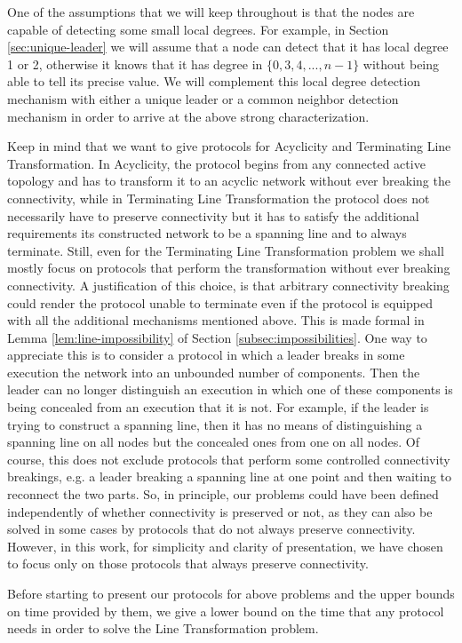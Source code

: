 \documentclass[preprint]{elsarticle}
\begin{document}
One of the assumptions that we will keep throughout is that the nodes are capable of detecting some small local degrees. For example, in Section \ref{sec:unique-leader} we will assume that a node can detect that it has local degree 1 or 2, otherwise it knows that it has degree in $\{0,3,4,...,n-1\}$ without being able to tell its precise value. We will complement this local degree detection mechanism with either a unique leader or a common neighbor detection mechanism in order to arrive at the above strong characterization. 

Keep in mind that we want to give protocols for Acyclicity and Terminating Line Transformation. In Acyclicity, the protocol begins from any connected active topology and has to transform it to an acyclic network without ever breaking the connectivity, while in Terminating Line Transformation the protocol does not necessarily have to preserve connectivity but it has to satisfy the additional requirements its constructed network to be a spanning line and to always terminate. Still, even for the Terminating Line Transformation problem we shall mostly focus on protocols that perform the transformation without ever breaking connectivity. A justification of this choice, is that arbitrary connectivity breaking could render the protocol unable to terminate even if the protocol is equipped with all the additional mechanisms mentioned above. This is made formal in Lemma \ref{lem:line-impossibility} of Section \ref{subsec:impossibilities}. One way to appreciate this is to consider a protocol in which a leader breaks in some execution the network into an unbounded number of components. Then the leader can no longer distinguish an execution in which one of these components is being concealed from an execution that it is not. For example, if the leader is trying to construct a spanning line, then it has no means of distinguishing a spanning line on all nodes but the concealed ones from one on all nodes. Of course, this does not exclude protocols that perform some controlled connectivity breakings, e.g. a leader breaking a spanning line at one point and then waiting to reconnect the two parts. So, in principle, our problems could have been defined independently of whether connectivity is preserved or not, as they can also be solved in some cases by protocols that do not always preserve connectivity. However, in this work, for simplicity and clarity of presentation, we have chosen to focus only on those protocols that always preserve connectivity.

Before starting to present our protocols for above problems and the upper bounds on time provided by them, we give a lower bound on the time that any protocol needs in order to solve the Line Transformation problem.
\end{document}
